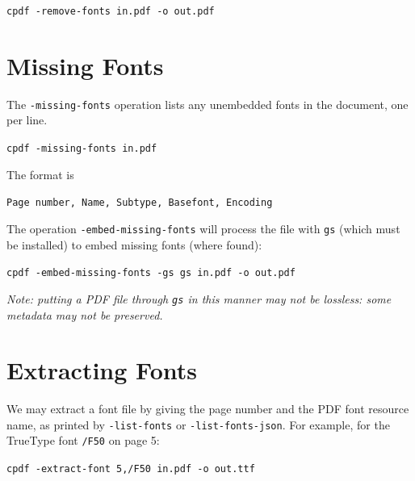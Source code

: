 \documentclass{book}
\begin{document}
  \begin{framed}
  \small\noindent\verb!cpdf -remove-fonts in.pdf -o out.pdf!
  \end{framed}

\section{Missing Fonts}\label{listmisingfonts}
  The \verb!-missing-fonts! operation lists any unembedded fonts in the document, one per line.

  \begin{framed}
  \small\noindent\verb!cpdf -missing-fonts in.pdf!
  \end{framed}

  \noindent The format is

  \begin{framed}
  \small\noindent\verb!Page number, Name, Subtype, Basefont, Encoding!
  \end{framed}

\noindent The operation \texttt{-embed-missing-fonts} will process the file with \texttt{gs} (which must be installed) to embed missing fonts (where found):

  \begin{framed}
  \small\noindent\verb!cpdf -embed-missing-fonts -gs gs in.pdf -o out.pdf!
  \end{framed}

\noindent\textit{Note: putting a PDF file through \texttt{gs} in this manner may not be lossless: some metadata may not be preserved.}

\section{Extracting Fonts}

We may extract a font file by giving the page number and the PDF font resource name, as printed by \texttt{-list-fonts} or \texttt{-list-fonts-json}. For example, for the TrueType font \texttt{/F50} on page 5:

  \begin{framed}
  \small\noindent\verb!cpdf -extract-font 5,/F50 in.pdf -o out.ttf!
  \end{framed}

\ \ \ 
\end{document}
